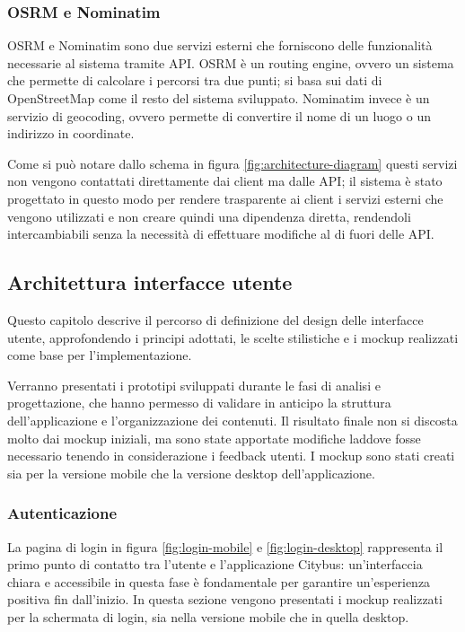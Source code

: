 \subsubsection{OSRM e Nominatim}

OSRM e Nominatim sono due servizi esterni che forniscono delle funzionalità necessarie al sistema tramite API.
OSRM è un routing engine, ovvero un sistema che permette di calcolare i percorsi tra due punti; si basa sui dati di OpenStreetMap come il resto del sistema sviluppato.
Nominatim invece è un servizio di geocoding, ovvero permette di convertire il nome di un luogo o un indirizzo in coordinate.

Come si può notare dallo schema in figura \ref{fig:architecture-diagram} questi servizi non vengono contattati direttamente dai client ma dalle API; il sistema è stato progettato in questo modo per rendere trasparente ai client i servizi esterni che vengono utilizzati e non creare quindi una dipendenza diretta, rendendoli intercambiabili senza la necessità di effettuare modifiche al di fuori delle API.

\subsection{Architettura interfacce utente}

Questo capitolo descrive il percorso di definizione del design delle interfacce utente, approfondendo i principi adottati, le scelte stilistiche e i mockup realizzati come base per l’implementazione.

Verranno presentati i prototipi sviluppati durante le fasi di analisi e progettazione, che hanno permesso di validare in anticipo la struttura dell’applicazione e l’organizzazione dei contenuti. Il risultato finale non si discosta molto dai mockup iniziali, ma sono state apportate modifiche laddove fosse necessario tenendo in considerazione i feedback utenti.
I mockup sono stati creati sia per la versione mobile che la versione desktop dell'applicazione.

\subsubsection{Autenticazione}

La pagina di login in figura \ref{fig:login-mobile} e \ref{fig:login-desktop} rappresenta il primo punto di contatto tra l’utente e l’applicazione Citybus: un’interfaccia chiara e accessibile in questa fase è fondamentale per garantire un’esperienza positiva fin dall’inizio. In questa sezione vengono presentati i mockup realizzati per la schermata di login, sia nella versione mobile che in quella desktop.

